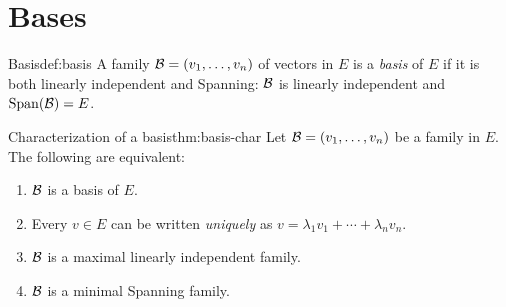 \section{Bases}\label{sec:bases}

\begin{definition}{Basis}{def:basis}
A family ${\mathcal{B}} = (v_1,\ldots,v_n)$ of vectors in $E$ is a \emph{basis}
of $E$ if it is both linearly independent and Spanning: ${\mathcal{B}}$ is
linearly independent and $\operatorname{Span}({\mathcal{B}}) = E$.
\end{definition}

\begin{theorem}{Characterization of a basis}{thm:basis-char}
Let ${\mathcal{B}} = (v_1,\ldots,v_n)$ be a family in $E$. The following are
equivalent:
\begin{enumerate}[label=(\roman*)]
  \item ${\mathcal{B}}$ is a basis of $E$.
  \item Every $v\in E$ can be written \emph{uniquely} as
    $v = \lambda_1 v_1 + \cdots + \lambda_n v_n$.
  \item ${\mathcal{B}}$ is a maximal linearly independent family.
  \item ${\mathcal{B}}$ is a minimal Spanning family.
\end{enumerate}
\end{theorem}

